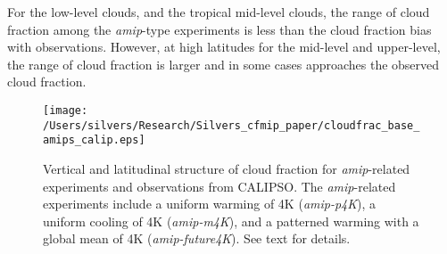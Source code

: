 \documentclass[draft]{agujournal2019}
\begin{document}
For the low-level clouds, and the tropical mid-level clouds, the range of cloud fraction among the \textit{amip}-type
experiments is less than the cloud fraction bias with observations.  However, at high latitudes for the mid-level and upper-level, 
the range of cloud fraction is larger and in some cases approaches the observed cloud fraction.   

\begin{figure}
  \centering
  \texttt{[image: /Users/silvers/Research/Silvers\_cfmip\_paper/cloudfrac\_base\_amips\_calip.eps]}
  \caption{Vertical and latitudinal structure of cloud fraction for \textit{amip}-related experiments and observations from 
  CALIPSO.  The \textit{amip}-related experiments include a uniform warming of 4K (\textit{amip-p4K}), 
  a uniform cooling of 4K (\textit{amip-m4K}), and a 
  patterned warming with a global mean of 4K (\textit{amip-future4K}).  See text for details.}
  \label{fig:calipso_amip_comparison}
\end{figure}


\end{document}
